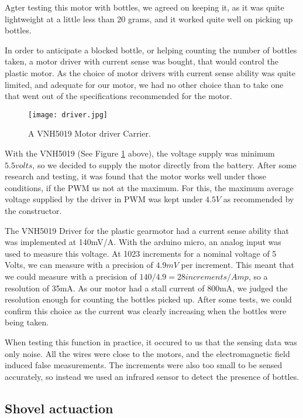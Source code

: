 Agter testing this motor with bottles, we agreed on keeping it, as it was quite lightweight at a little less than 20 grams, and it worked quite well on picking up bottles. 

In order to anticipate a blocked bottle, or helping counting the number of bottles taken, a motor driver with current sense was bought, that would control the plastic motor. As the choice of motor drivers with current sense ability was quite limited, and adequate for our motor, we had no other choice than to take one that went out of the specifications recommended for the motor.

\begin{figure}[H]
  \centering
  \texttt{[image: driver.jpg]}
  \caption{A VNH5019 Motor driver Carrier.}
\label{fig:driver}
\end{figure}

With the VNH5019 (See Figure \ref{fig:driver} above), the voltage supply was minimum $5.5 volts$, so we decided to supply the motor directly from the battery. After some research and testing, it was found that the motor works well under those conditions, if the PWM us not at the maximum. For this, the maximum average voltage supplied by the driver in PWM was kept under $4.5 V$ as recommended by the constructor.

The VNH5019 Driver for the plastic gearmotor had a current sense ability that was implemented at 140mV/A. With the arduino micro, an analog input was used to measure this voltage. At 1023 increments for a nominal voltage of 5 Volts, we can measure with a precision of $4.9 mV$ per increment. This meant that we could measure with a precision of $140/4.9 = 28 increments / Amp$, so a resolution of 35mA. As our motor had a stall current of 800mA, we judged the resolution enough for counting the bottles picked up. After some tests, we could confirm this choice as the current was clearly increasing when the bottles were being taken.

When testing this function in practice, it occured to us that the sensing data was only noise. All the wires were close to the motors, and the electromagnetic field induced false measurements. The increments were also too small to be sensed accurately, so instead we used an infrared sensor to detect the presence of bottles.

\subsection{Shovel actuaction}

